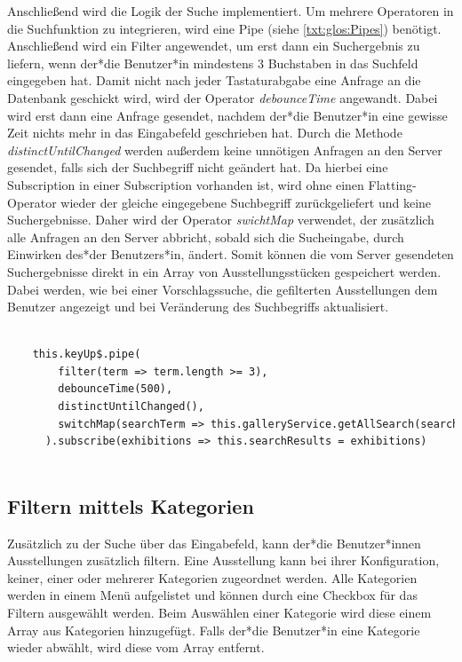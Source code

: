 Anschließend wird die Logik der Suche implementiert. Um mehrere Operatoren in die Suchfunktion zu integrieren, wird eine Pipe (siehe \ref{txt:glos:Pipes}) benötigt. Anschließend wird ein Filter angewendet, um erst dann ein Suchergebnis zu liefern, wenn der*die Benutzer*in mindestens 3 Buchstaben in das Suchfeld eingegeben hat. Damit nicht nach jeder Tastaturabgabe eine Anfrage an die Datenbank geschickt wird, wird der Operator \emph{debounceTime} angewandt. Dabei wird erst dann eine Anfrage gesendet, nachdem der*die Benutzer*in eine gewisse Zeit nichts mehr in das Eingabefeld geschrieben hat. Durch die Methode \emph{distinctUntilChanged} werden außerdem keine unnötigen Anfragen an den Server gesendet, falls sich der Suchbegriff nicht geändert hat. Da hierbei eine Subscription in einer Subscription vorhanden ist, wird ohne einen Flatting-Operator wieder der gleiche eingegebene Suchbegriff zurückgeliefert und keine Suchergebnisse. Daher wird der Operator \emph{swichtMap} verwendet, der zusätzlich alle Anfragen an den Server abbricht, sobald sich die Sucheingabe, durch Einwirken des*der Benutzers*in, ändert. Somit können die vom Server gesendeten Suchergebnisse direkt in ein Array von Ausstellungsstücken gespeichert werden. Dabei werden, wie bei einer Vorschlagssuche, die gefilterten Ausstellungen dem Benutzer angezeigt und bei Veränderung des Suchbegriffs aktualisiert.

\begin{lstlisting}[caption={Die Such-Pipe mit den Filter-Operatoren},language=HTML]

    this.keyUp$.pipe(
        filter(term => term.length >= 3),
        debounceTime(500),
        distinctUntilChanged(),
        switchMap(searchTerm => this.galleryService.getAllSearch(searchTerm)),
      ).subscribe(exhibitions => this.searchResults = exhibitions)
        
\end{lstlisting}

\subsection{Filtern mittels Kategorien}

Zusätzlich zu der Suche über das Eingabefeld, kann der*die Benutzer*innen Ausstellungen zusätzlich filtern. Eine Ausstellung kann bei ihrer Konfiguration, keiner, einer oder mehrerer Kategorien zugeordnet werden. Alle Kategorien werden in einem Menü aufgelistet und können durch eine Checkbox für das Filtern ausgewählt werden. Beim Auswählen einer Kategorie wird diese einem Array aus Kategorien hinzugefügt. Falls der*die Benutzer*in eine Kategorie wieder abwählt, wird diese vom Array entfernt.   


